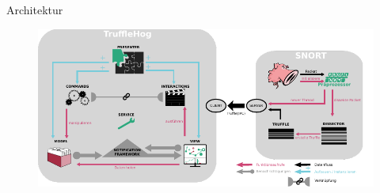 \begin{frame}{Architektur}
    \begin{figure}
    	\centering
    	\includegraphics[width=\textwidth]{./images/19.pdf}
    \end{figure}
\end{frame}
